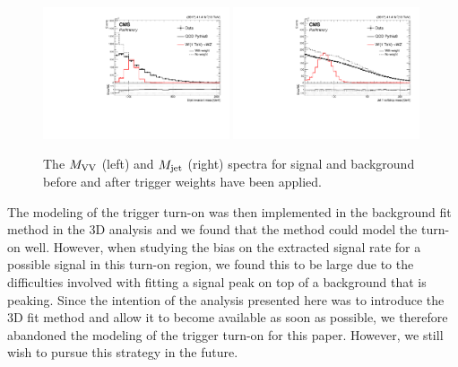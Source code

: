 \begin{figure}[h!]
\centering
\includegraphics[width=0.49\textwidth]{figures/analysis/search3/B2G-18-002/trigWeightCompare_looseSel_Dijet_invariant_mass.pdf}
\includegraphics[width=0.49\textwidth]{figures/analysis/search3/B2G-18-002/trigWeightCompare_looseSel_Jet_1_softdrop_mass.pdf}
\caption{The $M_{\rm VV}$ (left) and $M_{\rm jet}$ (right) spectra for signal and background before and after trigger weights have been applied.}
\label{fig:triggerMCspectra}
\end{figure}
The modeling of the trigger turn-on was then implemented in the background fit method in the 3D analysis and we found that the method could model the turn-on well. However, when studying the bias on the extracted signal rate for a possible signal in this turn-on region, we found this to be large due to the difficulties involved with fitting a signal peak on top of a background that is peaking. Since the intention of the analysis presented here was to introduce the 3D fit method and allow it to become available as soon as possible, we therefore abandoned the modeling of the trigger turn-on for this paper. However, we still wish to pursue this strategy in the future.
\clearpage

